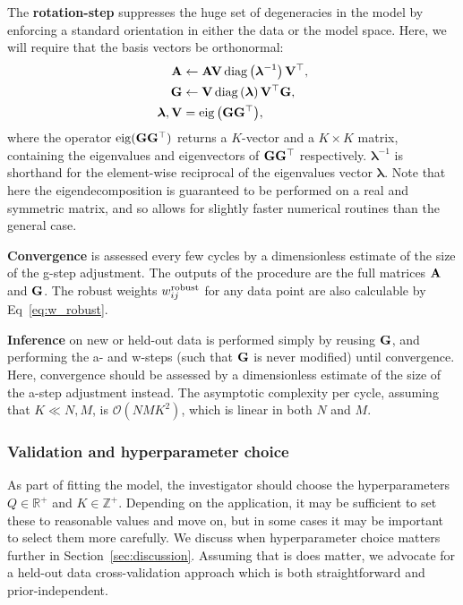\documentclass[onecolumn,floatfix]{aastex631}
\DeclareMathOperator{\eig}{eig}
\begin{document}
The \textbf{rotation-step} suppresses the huge set of degeneracies in the model by enforcing a standard orientation in either the data or the model space. Here, we will require that the basis vectors be orthonormal:
\begin{align}
    {\bf A} &\leftarrow {\bf A} {\bf V} \, {\rm diag} \left(\boldsymbol{\lambda}^{-1}\right) {\bf V}^\top, \\
    {\bf G} &\leftarrow {\bf V} \, {\rm diag} \left(\boldsymbol{\lambda}\right) {\bf V}^\top {\bf G}, \\
    \boldsymbol{\lambda}, {\bf V} &= \eig{\left( {\bf G} {\bf G}^\top \right)},
\end{align}
where the operator ${\rm eig}({\bf G} {\bf G}^\top)$ returns a $K$-vector and a $K\times K$ matrix, containing the eigenvalues and eigenvectors of ${\bf G} {\bf G}^\top$ respectively.
$\boldsymbol{\lambda}^{-1}$ is shorthand for the element-wise reciprocal of the eigenvalues vector $\boldsymbol{\lambda}$.
Note that here the eigendecomposition is guaranteed to be performed on a real and symmetric matrix, and so allows for slightly faster numerical routines than the general case.

\textbf{Convergence} is assessed every few cycles by a dimensionless estimate of the size of the g-step adjustment.
The outputs of the procedure are the full matrices ${\bf A}$ and ${\bf G}$.
The robust weights $w^{\rm robust}_{ij}$ for any data point are also calculable by Eq~\eqref{eq:w_robust}.

\textbf{Inference} on new or held-out data is performed simply by reusing ${\bf G}$, and performing the a- and w-steps (such that ${\bf G}$ is never modified) until convergence.
Here, convergence should be assessed by a dimensionless estimate of the size of the a-step adjustment instead.
The asymptotic complexity per cycle, assuming that $K \ll N, M$, is $\mathcal{O}(NMK^2)$, which is linear in both $N$ and $M$.

\subsubsection{Validation and hyperparameter choice} \label{sec:cv}

As part of fitting the model, the investigator should choose the hyperparameters $Q\in \mathbb{R}^+$ and $K\in \mathbb{Z}^+$.
Depending on the application, it may be sufficient to set these to reasonable values and move on, but in some cases it may be important to select them more carefully.
We discuss when hyperparameter choice matters further in Section~\ref{sec:discussion}.
Assuming that is does matter, we advocate for a held-out data cross-validation approach which is both straightforward and prior-independent.
\end{document}
